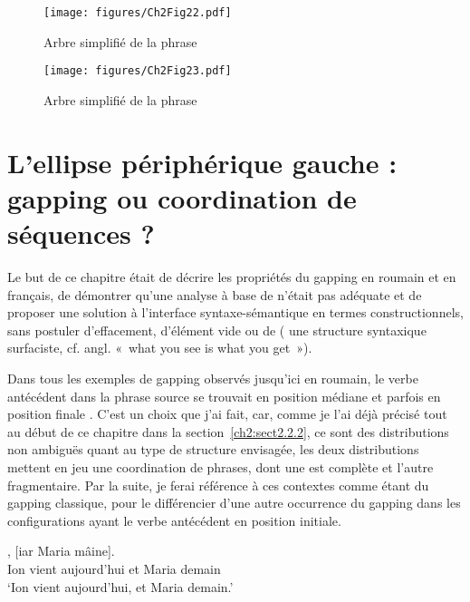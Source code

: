 \begin{sidewaysfigure} 

\texttt{[image: figures/Ch2Fig22.pdf]}%

\caption{Arbre simplifié de la phrase }
\label{ch2:fig22}
\end{sidewaysfigure}


\begin{sidewaysfigure} 
\texttt{[image: figures/Ch2Fig23.pdf]}%
\caption{Arbre simplifié de la phrase }
\label{ch2:fig23}
\end{sidewaysfigure}


\section{L’ellipse périphérique gauche : gapping ou coordination de séquences ?} \label{ch2:sect2.6}

Le but de ce chapitre était de décrire les propriétés du gapping en roumain et en français, de démontrer qu’une analyse à base de  n’était pas adéquate et de proposer une solution à l’interface syntaxe-sémantique en termes constructionnels, sans postuler d’effacement, d’élément vide ou de  ({\cad} une structure syntaxique surfaciste, cf. angl. «~what you see is what you get~»). 

Dans tous les exemples de gapping observés jusqu’ici en roumain, le verbe antécédent dans la phrase source se trouvait en position médiane  et parfois en position finale . C’est un choix que j’ai fait, car, comme je l’ai déjà précisé tout au début de ce chapitre dans la section~\ref{ch2:sect2.2.2}, ce sont des distributions non ambiguës quant au type de structure envisagée, {\cad} les deux distributions mettent en jeu une coordination de phrases, dont une est complète et l’autre fragmentaire. Par la suite, je ferai référence à ces contextes comme étant du gapping classique, pour le différencier d’une autre occurrence du gapping dans les configurations ayant le verbe antécédent en position initiale.

\ea \label{ch2:ex278}
\ea {}
,  [iar  Maria  mâine]. \label{ch2:ex278a}\\
Ion  vient  aujourd’hui  et  Maria  demain\\
\glt ‘Ion vient aujourd’hui, et Maria demain.’

